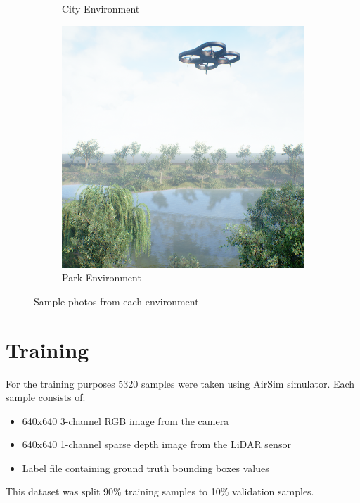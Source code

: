 \documentclass[twoside]{ctuthesis}
\theoremstyle{plain}
\theoremstyle{definition}
\theoremstyle{note}
\begin{document}
\begin{figure}
\begin{subfigure}[b]{0.3\textwidth}
		\caption{City Environment}
	\end{subfigure}
	\hfill
	\begin{subfigure}[b]{0.3\textwidth}
		\centering
		\includegraphics[width=\textwidth]{park_rgb.png}
		\caption{Park Environment}
	\end{subfigure}
	\caption{Sample photos from each environment}
\end{figure}
\chapter{Training}
For the training purposes 5320 samples were taken using AirSim simulator. Each sample consists of:
\begin{itemize}
	\item 640x640 3-channel RGB image from the camera
	\item 640x640 1-channel sparse depth image from the LiDAR sensor
	\item Label file containing ground truth bounding boxes values
\end{itemize}
This dataset was split 90\% training samples to 10\% validation samples. 
\end{document}
